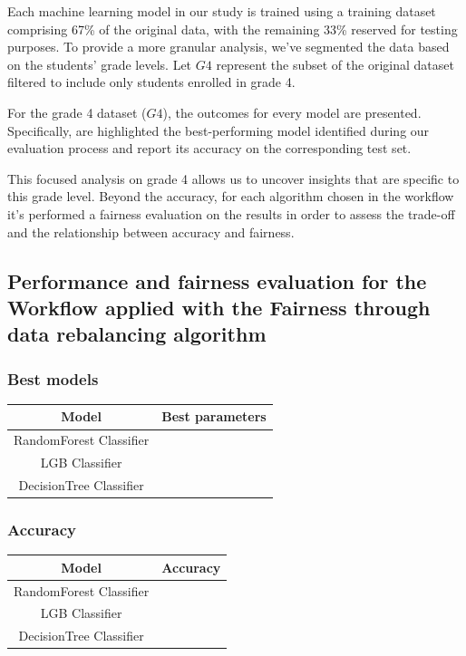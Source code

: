 \documentclass[12pt,a4paper,openright,twoside]{book}
\begin{document}
Each machine learning model in our study is trained using a training dataset comprising 67\% of the original data, with the remaining 33\% reserved for testing purposes. To provide a more granular analysis, we've segmented the data based on the students' grade levels. Let \( G4 \) represent the subset of the original dataset filtered to include only students enrolled in grade 4.

For the grade 4 dataset (\( G4 \)), the outcomes for every model are presented. Specifically, are highlighted the best-performing model identified during our evaluation process and report its accuracy on the corresponding test set.

This focused analysis on grade 4 allows us to uncover insights that are specific to this grade level. Beyond the accuracy, for each algorithm chosen in the workflow it's performed a fairness evaluation on the results in order to assess the trade-off and the relationship between accuracy and fairness.

\subsection{Performance and fairness evaluation for the Workflow applied with the Fairness through data rebalancing algorithm}

\subsubsection{Best models}

\begin{tabular}{|c|c|}
    \hline
    \textbf{Model} & \textbf{Best parameters} \\
    \hline
    RandomForest Classifier  &  \\
    \hline
    LGB Classifier & \\
    \hline
    DecisionTree Classifier & \\
    \hline
\end{tabular}

\subsubsection{Accuracy}

\begin{tabular}{|c|c|}
    \hline
    \textbf{Model} & \textbf{Accuracy} \\ 
    \hline
    RandomForest Classifier  &  \\
    \hline
    LGB Classifier & \\
    \hline
    DecisionTree Classifier & \\ 
    \hline
\end{tabular}
\end{document}
